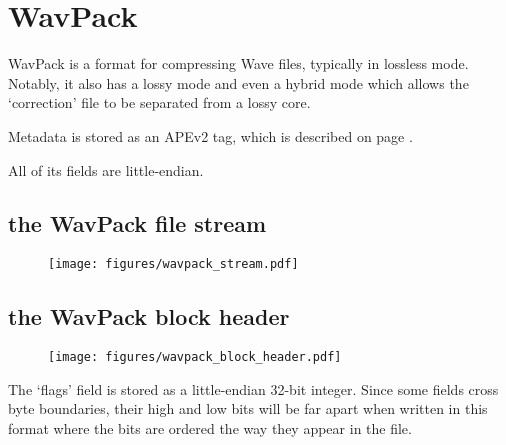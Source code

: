\chapter{WavPack}
WavPack is a format for compressing Wave files, typically in lossless mode.
Notably, it also has a lossy mode and even a hybrid mode which allows
the `correction' file to be separated from a lossy core.

Metadata is stored as an APEv2 tag, which is described on page \pageref{apev2}.

All of its fields are little-endian.

\section{the WavPack file stream}
\begin{figure}[h]
\texttt{[image: figures/wavpack\_stream.pdf]}
\end{figure}

\pagebreak

\section{the WavPack block header}
\begin{figure}[h]
\texttt{[image: figures/wavpack\_block\_header.pdf]}
\end{figure}
The `flags' field is stored as a little-endian 32-bit integer.
Since some fields cross byte boundaries, their high and low bits
will be far apart when written in this format where the bits are
ordered the way they appear in the file.

